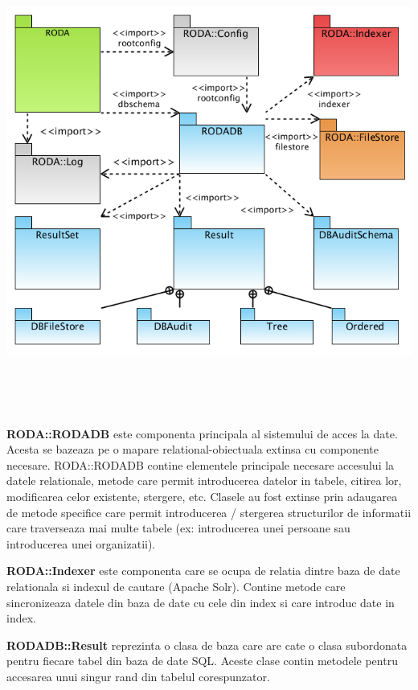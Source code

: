 \documentclass[a4paper]{article}
\begin{document}
{\bigskip

{\centering  \includegraphics[width=6.9272in,height=5.9583in]{rodaraportfaza2-img001.png} \par}
{
\textbf{RODA::RODADB} este componenta principala al sistemului de acces la date. Acesta se bazeaza pe o mapare
relational-obiectuala extinsa cu componente necesare. RODA::RODADB contine elementele principale necesare accesului la
datele relationale, metode care permit introducerea datelor in tabele, citirea lor, modificarea celor existente,
stergere, etc. Clasele au fost extinse prin adaugarea de metode specifice care permit introducerea / stergerea
structurilor de informatii care traverseaza mai multe tabele (ex: introducerea unei persoane sau introducerea unei
organizatii).}


\bigskip

{
\textbf{RODA::Indexer} este componenta care se ocupa de relatia dintre baza de date relationala si indexul de cautare
(Apache Solr). Contine metode care sincronizeaza datele din baza de date cu cele din index si care introduc date in
index.}


\bigskip

{
\textbf{RODADB::Result} reprezinta o clasa de baza care are cate o clasa subordonata pentru fiecare tabel din baza de
date SQL. Aceste clase contin metodele pentru accesarea unui singur rand din tabelul corespunzator.}


}
\end{document}
